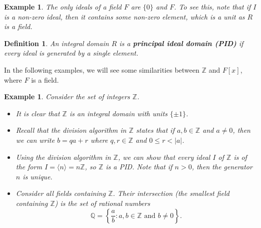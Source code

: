 \documentclass[10pt]{article}
\newcommand{\Z}{\mathbb{Z}}
\newcommand{\Q}{\mathbb{Q}}
\theoremstyle{newstyle}
\newtheorem{defn}[thm]{Definition}
\newtheorem{exmp}[thm]{Example}
\begin{document}
\begin{exmp}
The only ideals of a field $F$ are $\{0\}$ and $F$. To see this, note that if $I$ is a non-zero 
ideal, then it contains some non-zero element, which is a unit as $R$ is a field.
\end{exmp}

\begin{defn}
An integral domain $R$ is a {\bf principal ideal domain (PID)} if every ideal is generated by 
a single element.
\end{defn}

In the following examples, we will see some similarities between $\Z$ and $F[x]$, where $F$ is a field.

\begin{exmp}
Consider the set of integers $\Z$. 
\begin{itemize}
    \item It is clear that $\Z$ is an integral domain with units $\{\pm1\}$. 
    \item Recall that the division algorithm in $\Z$ states that if $a, b \in \Z$ and $a \neq 0$, 
    then we can write $b = qa + r$ where $q, r \in \Z$ and $0 \leq r < |a|$.
    \item Using the division algorithm in $\Z$, we can show that every ideal $I$ of $\Z$ is 
    of the form $I = \langle n \rangle = n\Z$, so $\Z$ is a PID. Note that if 
    $n > 0$, then the generator $n$ is unique.
    \item Consider all fields containing $\Z$. Their intersection (the smallest field containing $\Z$) 
    is the set of rational numbers 
    \[ \Q = \left\{ \frac{a}b : a, b \in \Z \text{ and } b \neq 0 \right\}. \]
\end{itemize}
\end{exmp}
\end{document}
